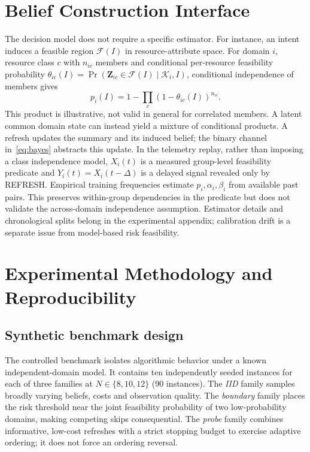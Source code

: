 \documentclass[conference]{IEEEtran}
\begin{document}
\section{Belief Construction Interface}
\label{app:belief}
The decision model does not require a specific estimator. For instance, an intent induces a feasible region $\mathcal F(I)$ in resource-attribute space. For domain $i$, resource class $c$ with $n_{ic}$ members and conditional per-resource feasibility probability $\theta_{ic}(I)=\Pr(\mathbf Z_{ic}\in\mathcal F(I)\mid\mathcal K_i,I)$, conditional independence of members gives
\begin{equation}
 p_i(I)=1-\prod_c(1-\theta_{ic}(I))^{n_{ic}}.
\end{equation}
This product is illustrative, not valid in general for correlated members. A latent common domain state can instead yield a mixture of conditional products. A refresh updates the summary and its induced belief; the binary channel in~\eqref{eq:bayes} abstracts this update. In the telemetry replay, rather than imposing a class independence model, $X_i(t)$ is a measured group-level feasibility predicate and $Y_i(t)=X_i(t-\Delta)$ is a delayed signal revealed only by REFRESH. Empirical training frequencies estimate $p_i,\alpha_i,\beta_i$ from available past pairs. This preserves within-group dependencies in the predicate but does not validate the across-domain independence assumption. Estimator details and chronological splits belong in the experimental appendix; calibration drift is a separate issue from model-based risk feasibility.

\section{Experimental Methodology and Reproducibility}
\label{app:experiments}
\subsection{Synthetic benchmark design}
The controlled benchmark isolates algorithmic behavior under a known independent-domain model. It contains ten independently seeded instances for each of three families at $N\in\{8,10,12\}$ (90 instances). The \emph{IID} family samples broadly varying beliefs, costs and observation quality. The \emph{boundary} family places the risk threshold near the joint feasibility probability of two low-probability domains, making competing skips consequential. The \emph{probe} family combines informative, low-cost refreshes with a strict stopping budget to exercise adaptive ordering; it does not force an ordering reversal.
\end{document}
